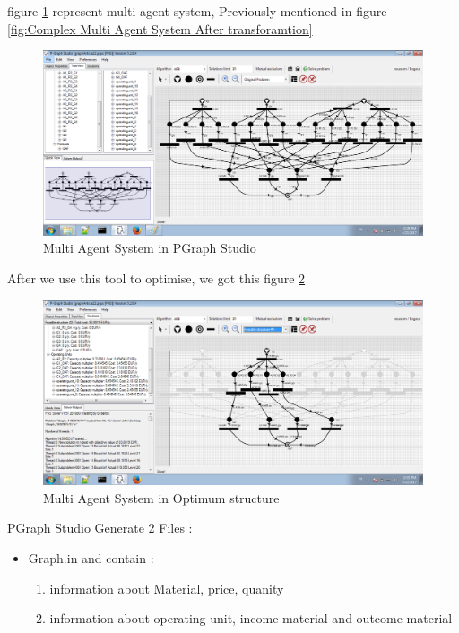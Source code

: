 figure \ref{fig:Multi Agent System in PGraph Studio} represent multi agent system, Previously mentioned in figure \ref{fig:Complex Multi Agent System After transforamtion} 
\begin{figure}[th]
	\centering
		\includegraphics[scale=0.44]{ch3/img/pgraphArt}
	\caption{\label{fig:Multi Agent System in PGraph Studio}Multi Agent System in PGraph Studio}
\end{figure} 
\pagebreak
After we use this tool to optimise, we got this figure \ref{fig:Multi Agent System in Optimum structure}

\begin{figure}[th]
	\centering
		\includegraphics[scale=0.44]{ch3/img/pgraphSol}
	\caption{\label{fig:Multi Agent System in Optimum structure}Multi Agent System in Optimum structure}
\end{figure} 

PGraph Studio Generate 2 Files : 
\begin{itemize}
	\item Graph.in and contain :
		\begin{enumerate}
			\item information about Material, price, quanity
			\item information about operating unit, income material and outcome material 
 	\end{enumerate}

\end{itemize}

